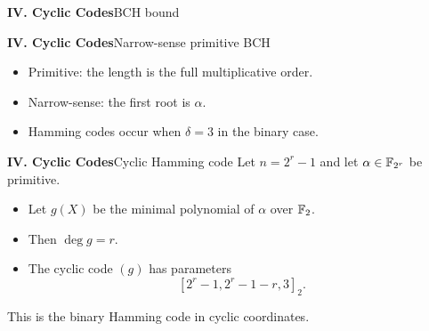 %
%

\begin{frame}{\textbf{IV. Cyclic Codes}}{BCH bound}
\small
{}
\end{frame}

\begin{frame}{\textbf{IV. Cyclic Codes}}{Narrow-sense primitive BCH}
\small
{}
\begin{itemize}
  \item Primitive: the length is the full multiplicative order.
  \item Narrow-sense: the first root is $\alpha$.
  \item Hamming codes occur when $\delta=3$ in the binary case.
\end{itemize}
\end{frame}

\begin{frame}{\textbf{IV. Cyclic Codes}}{Cyclic Hamming code}
\small
Let $n=2^r-1$ and let $\alpha\in\mathbb{F}_{2^r}$ be primitive.
\begin{itemize}
  \item Let $g(X)$ be the minimal polynomial of $\alpha$ over $\mathbb{F}_2$.
  \item Then $\deg g=r$.
  \item The cyclic code $(g)$ has parameters
  \[
    [2^r-1,2^r-1-r,3]_2.
  \]
\end{itemize}
This is the binary Hamming code in cyclic coordinates.
\end{frame}

